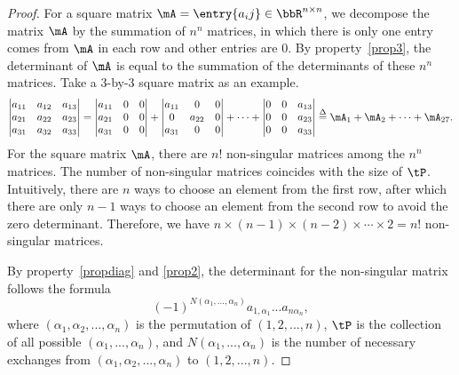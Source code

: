 \documentclass[11pt]{article}
\theoremstyle{plain}
\theoremstyle{definition}
\begin{document}
\begin{proof}
	For a square matrix $\mA = \entry{a_ij} \in \bbR^{n \times n}$, we decompose the  matrix $\mA$ by the summation of $n^n$ matrices, in which there is only one entry comes from $\mA$ in each row and other entries are 0. By property~\ref{prop3}, the determinant of $\mA$ is equal to the summation of the determinants of these $n^n$ matrices. Take a 3-by-3 square matrix as an example.
	\begin{align}
		\begin{vmatrix}
			a_{11} & a_{12} & a_{13}\\
			a_{21} & a_{22} & a_{23}\\
			a_{31} & a_{32} & a_{33}
		\end{vmatrix} = \begin{vmatrix}
			a_{11} & 0& 0\\
			a_{21} & 0 & 0\\
			a_{31} &0 & 0
		\end{vmatrix} + \begin{vmatrix}
			a_{11} & 0& 0\\
			0 & a_{22} & 0\\
			a_{31} &0 & 0
		\end{vmatrix} + \cdots +\begin{vmatrix}
			0 & 0& a_{13}\\
			0& 0 & a_{23}\\
			 0&0 & a_{33}
		\end{vmatrix} \overset{\Delta}{=} \mA_1 + \mA_2 +\cdots + \mA_{27}.
	\end{align}
	For the square matrix $\mA$,  there are $n!$ non-singular matrices among the $n^n$ matrices. The number of non-singular matrices coincides with the size of $\tP$. Intuitively, there are $n$ ways to choose an element from the first row, after which there are only $n-1$ ways to choose an element from the second row to avoid the zero determinant. Therefore, we have $n \times (n-1) \times (n-2) \times \cdots \times 2 = n!$ non-singular matrices.
	
	By property~\ref{propdiag} and \ref{prop2}, the determinant for the non-singular matrix follows the formula \[(-1)^{N(\alpha_1,...,\alpha_n)}  a_{1,\alpha_1} ... a_{n \alpha_n},\]
	where $(\alpha_1, \alpha_2, ...,\alpha_n)$ is the permutation of $(1,2,...,n)$, $\tP$ is the collection of all possible  $(\alpha_1,...,\alpha_n)$, and $N(\alpha_1,...,\alpha_n)$ is the number of necessary exchanges from $(\alpha_1,\alpha_2,...,\alpha_n)$  to $(1,2,...,n)$. 
\end{proof}
\end{document}
